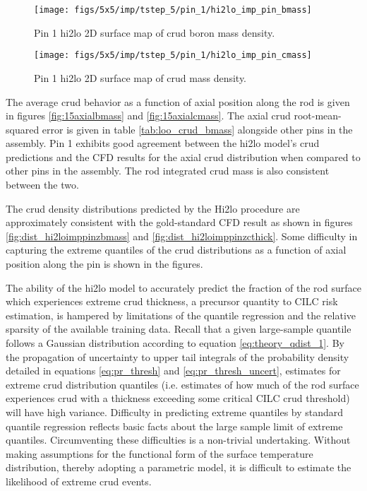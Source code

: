 \begin{figure}[H]
    \centering
    \texttt{[image: figs/5x5/imp/tstep\_5/pin\_1/hi2lo\_imp\_pin\_bmass]}
    \caption{Pin 1 hi2lo 2D surface map of crud boron mass density.}
    \label{fig:2d_hi2loimppinbmass}
\end{figure}
\begin{figure}[H]
    \centering
    \texttt{[image: figs/5x5/imp/tstep\_5/pin\_1/hi2lo\_imp\_pin\_cmass]}
    \caption{Pin 1 hi2lo 2D surface map of crud mass density.}
    \label{fig:2d_hi2loimppincmass}
\end{figure}

The average crud behavior as a function of axial position along the rod is given in figures \ref{fig:15axialbmass} and \ref{fig:15axialcmass}.  The axial crud root-mean-squared error is given in table \ref{tab:loo_crud_bmass} alongside other pins in the assembly.  Pin 1 exhibits good agreement between the hi2lo model's crud predictions and the CFD results for the axial crud distribution when compared to other pins in the assembly.  The rod integrated crud mass is also consistent between the two.

The crud density distributions predicted by the Hi2lo procedure are approximately consistent with the gold-standard CFD result as shown in figures \ref{fig:dist_hi2loimppinzbmass} and \ref{fig:dist_hi2loimppinzcthick}. Some difficulty in capturing the extreme quantiles of the crud distributions as a function of axial position along the pin is shown in the figures. 

The ability of the hi2lo model to accurately predict the fraction of the rod surface which experiences extreme crud thickness, a precursor quantity to CILC risk estimation, is hampered by limitations of the quantile regression and the relative sparsity of the available training data.  Recall that a given large-sample quantile follows a Gaussian distribution according to equation \ref{eq:theory_qdist_1}. By the propagation of uncertainty to upper tail integrals of the probability density detailed in equations \ref{eq:pr_thresh} and \ref{eq:pr_thresh_uncert}, estimates for extreme crud distribution quantiles (i.e. estimates of how much of the rod surface experiences crud with a thickness exceeding some critical CILC crud threshold) will have high variance.  Difficulty in predicting extreme quantiles by standard quantile regression reflects basic facts about the large sample limit of extreme quantiles.
Circumventing these difficulties is a non-trivial undertaking.  Without making assumptions for the functional form of the surface temperature distribution, thereby adopting a parametric model, it is difficult to estimate the likelihood of extreme crud events.

